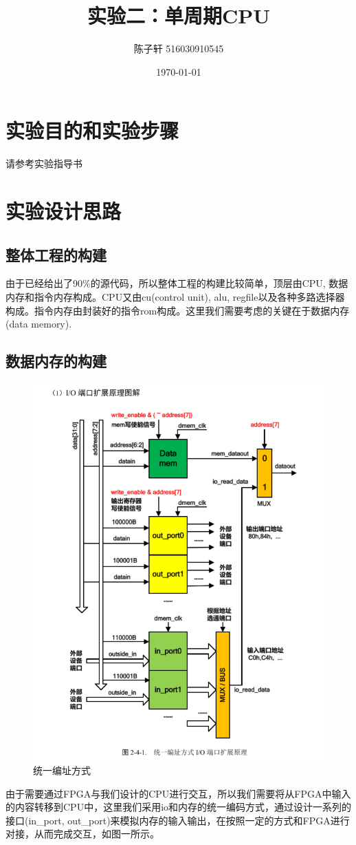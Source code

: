 \documentclass[UTF8]{ctexart}
\title{实验二：单周期CPU}
\author{陈子轩 516030910545}
\date{\today}
\begin{document}
\maketitle
\section{实验目的和实验步骤}
请参考实验指导书
\section{实验设计思路}
\subsection{整体工程的构建}
由于已经给出了90\%的源代码，所以整体工程的构建比较简单，顶层由CPU, 数据内存和指令内存构成。CPU又由cu(control unit), alu, regfile以及各种多路选择器构成。指令内存由封装好的指令rom构成。这里我们需要考虑的关键在于数据内存(data memory).
\subsection{数据内存的构建}
\begin{figure}
	\centering
	\includegraphics{uioaddr.PNG}
	\caption{统一编址方式}
\end{figure}
由于需要通过FPGA与我们设计的CPU进行交互，所以我们需要将从FPGA中输入的内容转移到CPU中，这里我们采用io和内存的统一编码方式，通过设计一系列的接口(in\_port, out\_port)来模拟内存的输入输出，在按照一定的方式和FPGA进行对接，从而完成交互，如图一所示。
\end{document}
